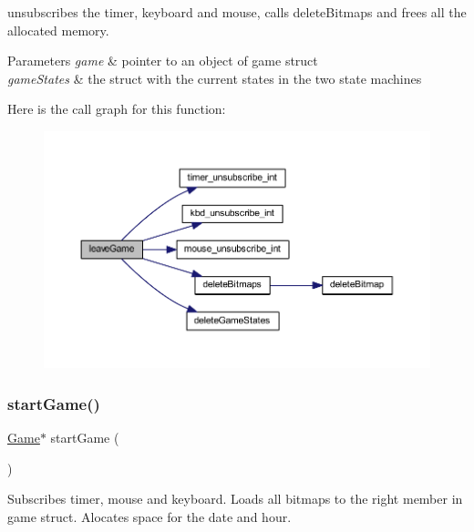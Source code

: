 unsubscribes the timer, keyboard and mouse, calls delete\+Bitmaps and frees all the allocated memory. 


\begin{DoxyParams}{Parameters}
{\em game} & pointer to an object of game struct \\
\hline
{\em game\+States} & the struct with the current states in the two state machines \\
\hline
\end{DoxyParams}
Here is the call graph for this function\+:
\nopagebreak
\begin{figure}[H]
\begin{center}
\leavevmode
\includegraphics[width=350pt]{group___game_ga6fcaca11a4e0464324d12d8995454396_cgraph}
\end{center}
\end{figure}
\mbox{\label{group___game_gadf0b0e23d862996b1c252ab29227ffb1}} 
\subsubsection{\texorpdfstring{start\+Game()}{startGame()}}
{\footnotesize\ttfamily \hyperlink{struct_game}{Game}$\ast$ start\+Game (\begin{DoxyParamCaption}{ }\end{DoxyParamCaption})}



Subscribes timer, mouse and keyboard. Loads all bitmaps to the right member in game struct. Alocates space for the date and hour. 

